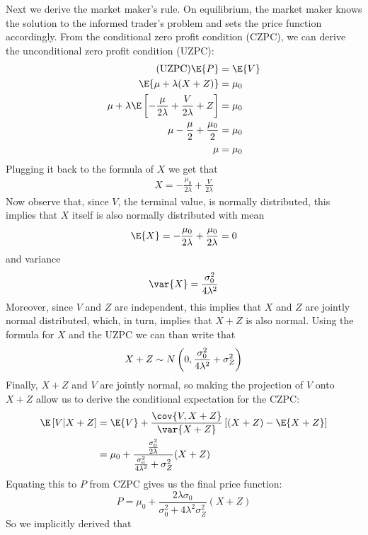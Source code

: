 \begin{solution}
    Next we derive the market maker's rule. On equilibrium, the market maker knows the solution to the informed trader's problem and sets the price function accordingly. From the conditional zero profit condition (CZPC), we can derive the unconditional zero profit condition (UZPC):
    \begin{align*}
        \tag{UZPC}
        \E{P} & = \E{V} \\
        \E{\mu + \lambda(X+Z)} & = \mu_0 \\ 
        \mu + \lambda\E\bs{-\frac{\mu}{2\lambda} + \frac{V}{2\lambda} + Z} & = \mu_0 \\
        \mu - \frac{\mu}{2} + \frac{\mu_0}{2} & = \mu_0 \\
        \mu & = \mu_0
    \end{align*}
    Plugging it back to the formula of \(X\) we get that
    \begin{align*}
        X = -\frac{\mu_0}{2\lambda} + \frac{V}{2\lambda}
    \end{align*}
    Now observe that, since \(V\), the terminal value, is normally distributed, this implies that \(X\) itself is also normally distributed with mean
    \[
        \E{X} = -\frac{\mu_0}{2\lambda} + \frac{\mu_0}{2\lambda} = 0
    \]
    and variance
    \[
        \var{X} = \frac{\sigma_0^2}{4\lambda^2}
    \]
    Moreover, since \(V\) and \(Z\) are independent, this implies that \(X\) and \(Z\) are jointly normal distributed, which, in turn, implies that \(X+Z\) is also normal. Using the formula for \(X\) and the UZPC we can than write that
    \[
        X + Z \sim N\left( 0, \frac{\sigma_0^2}{4\lambda^2} + \sigma_Z^2 \right)
    \]
    Finally, \(X+Z\) and \(V\) are jointly normal, so making the projection of \(V\) onto \(X+Z\) allow us to derive the conditional expectation for the CZPC:
    \begin{align*}
        \E\bs{V \vert X+Z} & = \E{V} + \frac{\cov{V, X+Z}}{\var{X+Z}}\bs{(X+Z)-\E{X+Z}}\\ 
        & = \mu_0 + \frac{\frac{\sigma_0^2}{2\lambda}}{ \frac{\sigma_0^2}{4\lambda^2} + \sigma_Z^2}(X+Z) \\
    \end{align*}
    Equating this to \(P\) from CZPC gives us the final price function:
    \begin{equation}
        \tag{Price Function}
        \label{eq:price_function}
        P = \mu_0 + \frac{2\lambda\sigma_0}{\sigma_0^2 + 4\lambda^2\sigma_Z^2}(X+Z)
    \end{equation}
    So we implicitly derived that

\end{solution}
